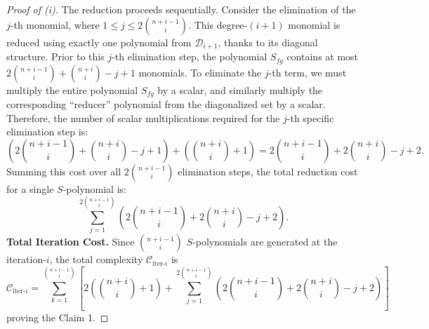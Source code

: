 \begin{proof}[Proof of  (i)]
The reduction proceeds sequentially. Consider the elimination of the $j$-th monomial, where $1 \le j \le 2\binom{n+i-1}{i}$. This degree-$(i+1)$ monomial is reduced using exactly one polynomial from $\mathcal{D}_{i+1}$, thanks to its diagonal structure. Prior to this $j$-th elimination step, the polynomial $S_{fg}$ contains at most $2\binom{n+i-1}{i} + \binom{n+i}{i} - j + 1$ monomials. 
To eliminate the $j$-th term, we must multiply the entire polynomial $S_{fg}$ by a scalar, and similarly multiply the corresponding ``reducer'' polynomial from the diagonalized set by a scalar. 
Therefore, the number of scalar multiplications required for the $j$-th specific elimination step is:
\[
\left(2\binom{n+i-1}{i} + \binom{n+i}{i} - j + 1\right) + \left(\binom{n+i}{i} + 1\right) = 2\binom{n+i-1}{i} + 2\binom{n+i}{i} - j + 2.
\]
Summing this cost over all $2\binom{n+i-1}{i}$ elimination steps, the total reduction cost for a single $S$-polynomial is:
\[
\sum_{j=1}^{2\binom{n+i-1}{i}} \left( 2\binom{n+i-1}{i} + 2\binom{n+i}{i} - j + 2 \right).
\]
\textbf{Total Iteration Cost.}
Since $\binom{n+i-1}{i}$ $S$-polynomials are generated at the iteration-$i$, the total complexity $\mathscr{C}_{\text{iter-}i}$ is
\[
\mathscr{C}_{\text{iter-}i} = \sum_{k=1}^{\binom{n+i-1}{i}} \left[ 2\left(\binom{n+i}{i}+1\right) + \sum_{j=1}^{2\binom{n+i-1}{i}} \left( 2\binom{n+i-1}{i} + 2\binom{n+i}{i} - j + 2 \right) \right]
\]
proving the {\textsf{Claim 1.}}




\end{proof}
